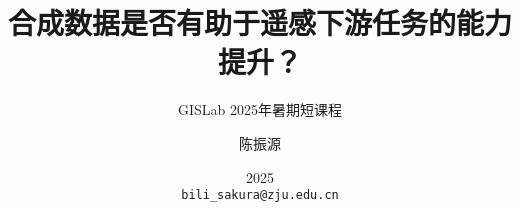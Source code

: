 \documentclass[aspectratio=169]{beamer}
\title[]{合成数据是否有助于遥感下游任务的能力提升？}
\subtitle{GISLab 2025年暑期短课程}
\author[Sakura]{陈振源}
\institute[ZJU]{浙江大学地球科学学院}
\date{2025\\\small\texttt{bili\_sakura@zju.edu.cn}}
\begin{document}
\begin{frame}
  \titlepage
\end{frame}


\end{document}
